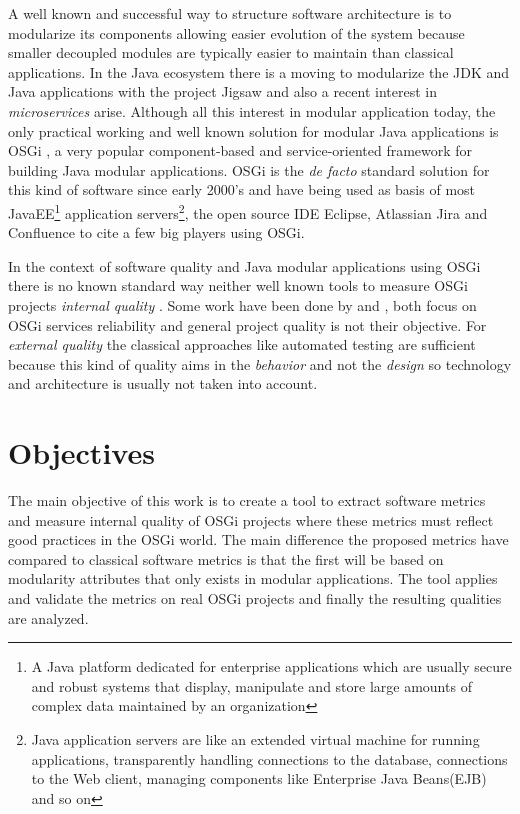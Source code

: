 A well known and successful way to structure software architecture is to modularize its components allowing easier evolution of the system because smaller decoupled modules are typically easier to maintain than classical applications. In the Java ecosystem there is a moving to modularize the JDK and Java applications with the project Jigsaw \citep{Krill 2012} and also a recent interest in \emph{microservices} \citep{Knorr 2014} arise. Although all this interest in modular application today, the only practical working and well known solution for modular Java applications is OSGi \citep{Hall 2011}, a very popular component-based and service-oriented framework for building Java modular applications. OSGi is the \emph{de facto} standard solution for this kind of software since early 2000's and have being used as basis of most JavaEE\footnote{A Java platform dedicated for enterprise applications which are usually secure and robust systems that display, manipulate and store large amounts of complex data maintained by an organization} application servers\footnote{Java application servers are like an extended virtual machine for running applications, transparently handling connections to the database, connections to the Web client, managing components like Enterprise Java Beans(EJB) and so on}, the open source IDE Eclipse\citep{eclipse 2006}, Atlassian Jira and Confluence to cite a few big players using OSGi. 

In the context of software quality and Java modular applications using OSGi there is no known standard way neither well known tools to measure OSGi projects \textit{internal quality} \citep{Hamza 2013} \citep{Wang 2012}. Some work have been done by \citep{Gama 2012} and \citep{Wang 2012}, both focus on OSGi services reliability and general project quality is not their objective. For \emph{external quality} the classical approaches like automated testing are sufficient because this kind of quality aims in the \emph{behavior} and not the \emph{design} so technology and architecture is usually not taken into account.

        
\section{Objectives}
The main objective of this work is to create a tool to extract software metrics and measure internal quality of OSGi projects where these metrics must reflect good practices in the OSGi world. The main difference the proposed metrics have compared to classical software metrics is that the first will be based on modularity attributes that only exists in modular applications. The tool applies and validate the metrics on real OSGi projects and finally the resulting qualities are analyzed.  

